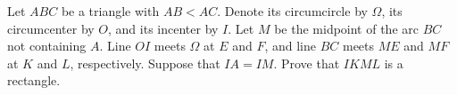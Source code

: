 Let $ABC$ be a triangle with $AB < AC$.
Denote its circumcircle by $\Omega$, its circumcenter by $O$, and its incenter by $I$.
Let $M$ be the midpoint of the arc $BC$ not containing $A$.
Line $OI$ meets $\Omega$ at $E$ and $F$, and line $BC$ meets $ME$ and $MF$ at $K$ and $L$, respectively.
Suppose that $IA = IM$.
Prove that $IKML$ is a rectangle.
